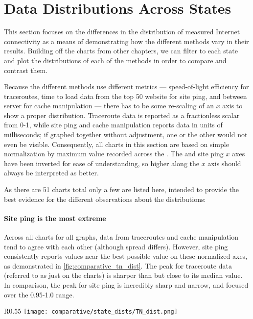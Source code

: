\section{Data Distributions Across States}\label{sec:comparative-distribution}

This section focuses on the differences in the distribution of measured Internet connectivity as a means of demonstrating how the different methods vary in their results. Building off the \kde charts from other chapters, we can filter to each state and plot the distributions of each of the methods in order to compare and contrast them.

Because the different methods use different metrics --- speed-of-light efficiency for traceroutes, time to load data from the top 50 website for site ping, and \rtt between \dns server for \dns cache manipulation --- there has to be some re-scaling of an $x$ axis to show a proper distribution. Traceroute data is reported as a fractionless scalar from 0-1, while site ping and \dns cache manipulation reports data in units of milliseconds; if graphed together without adjustment, one or the other would not even be visible. Consequently, all charts in this section are based on simple normalization by maximum value recorded across the \us. The \dns and site ping $x$ axes have been inverted for ease of understanding, so higher along the $x$ axis should always be interpreted as better.

As there are 51 charts total only a few are listed here, intended to provide the best evidence for the different observations about the distributions:

\paragraph{Site ping is the most extreme} Across all \kde charts for all graphs, data from traceroutes and \dns cache manipulation tend to agree with each other (although spread differs). However, site ping consistently reports values near the best possible value on these normalized axes, as demonstrated in \cref{fig:comparative_tn_dist}. The peak for traceroute data (referred to as just \caida on the charts) is sharper than \dns but close to its median value. In comparison, the peak for site ping is incredibly sharp and narrow, and focused over the 0.95-1.0 range.

\begin{wrapfigure}[16]{R}{0.55\textwidth}
    \centering
    \texttt{[image: comparative/state\_dists/TN\_dist.png]}
    \caption{Tennessee data distributions}
    \label{fig:comparative_tn_dist}
\end{wrapfigure}

